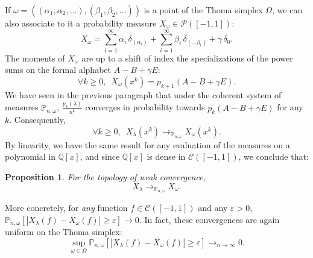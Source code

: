 \documentclass[smallextended,nospthms]{svjour3}
\newtheorem{proposition}[theorem]{Proposition}
\theoremstyle{remark}
\newcommand{\Q}{\mathbb{Q}}
\newcommand{\proba}{\mathbb{P}}
\newcommand{\eps}{\varepsilon}
\begin{document}
If $\omega =((\alpha_{1},\alpha_{2},\ldots),(\beta_{1},\beta_{2},\ldots))$ is a point of the Thoma simplex $\Omega$, we can also associate to it a probability measure $X_{\omega} \in \mathscr{P}([-1,1])$:
$$X_{\omega}=\sum_{i=1}^{\infty} \alpha_{i}\,\delta_{(\alpha_{i})}+\sum_{i=1}^{\infty} \beta_{i}\,\delta_{(-\beta_{i})} + \gamma \,\delta_{0}.$$
The moments of $X_{\omega}$ are up to a shift of index the specializations of the power sums on the formal alphabet $A-B+\gamma E$:
$$\forall k \geq 0,\,\,\, X_{\omega}(x^{k})=p_{k+1}(A-B+\gamma E).$$
We have seen in the previous paragraph that under the coherent system of measures $\proba_{n,\omega}$, $\frac{p_{k}(\lambda)}{n^{k}}$ converges in probability towards $p_{k}(A-B+\gamma E)$ for any $k$. Consequently,
$$\forall k \geq 0,\,\,\, X_{\lambda}(x^{k}) \longrightarrow_{\proba_{n,\omega}} X_{\omega}(x^{k}).$$
By linearity, we have the same result for any evaluation of the measures on a polynomial in $\Q[x]$, and since $\Q[x]$ is dense in $\mathscr{C}([-1,1])$, we conclude that:
\begin{proposition}
For the topology of weak convergence,
$$X_{\lambda}\longrightarrow_{\proba_{n,\omega}} X_{\omega}.$$
\end{proposition}
\noindent More concretely, for \emph{any} function $f \in \mathscr{C}([-1,1])$ and any $\eps>0$, $\proba_{n,\omega}[|X_{\lambda}(f)-X_{\omega}(f)|\geq \eps] \to 0$. In fact, these convergences are again uniform on the Thoma simplex:
$$\sup_{\omega \in \Omega}\proba_{n,\omega}[|X_{\lambda}(f)-X_{\omega}(f)|\geq \eps]\to_{n \to \infty} 0.$$
\bigskip
\end{document}
